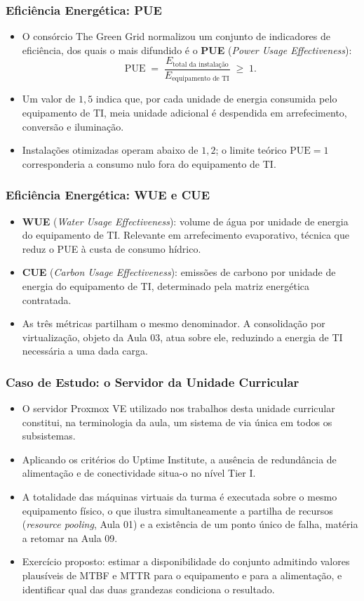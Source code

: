\documentclass[aspectratio=169]{beamer}
\begin{document}
\begin{frame}
\frametitle{Eficiência Energética: PUE}
\begin{itemize}
    \setlength\itemsep{0.35cm}
    \item O consórcio The Green Grid normalizou um conjunto de indicadores de eficiência, dos quais o mais difundido é o \textbf{PUE} (\emph{Power Usage Effectiveness}):
    \[
      \mathrm{PUE} \;=\; \frac{E_{\text{total da instalação}}}{E_{\text{equipamento de TI}}} \;\ge\; 1 .
    \]
    \item Um valor de $1{,}5$ indica que, por cada unidade de energia consumida pelo equipamento de TI, meia unidade adicional é despendida em arrefecimento, conversão e iluminação.
    \item Instalações otimizadas operam abaixo de $1{,}2$; o limite teórico $\mathrm{PUE}=1$ corresponderia a consumo nulo fora do equipamento de TI.
\end{itemize}
\end{frame}

\begin{frame}
\frametitle{Eficiência Energética: WUE e CUE}
\begin{itemize}
    \setlength\itemsep{0.4cm}
    \item \textbf{WUE} (\emph{Water Usage Effectiveness}): volume de água por unidade de energia do equipamento de TI. Relevante em arrefecimento evaporativo, técnica que reduz o PUE à custa de consumo hídrico.
    \item \textbf{CUE} (\emph{Carbon Usage Effectiveness}): emissões de carbono por unidade de energia do equipamento de TI, determinado pela matriz energética contratada.
    \item As três métricas partilham o mesmo denominador. A consolidação por virtualização, objeto da Aula 03, atua sobre ele, reduzindo a energia de TI necessária a uma dada carga.
\end{itemize}
\end{frame}

\begin{frame}
\frametitle{Caso de Estudo: o Servidor da Unidade Curricular}
\begin{itemize}
    \setlength\itemsep{0.35cm}
    \item O servidor Proxmox VE utilizado nos trabalhos desta unidade curricular constitui, na terminologia da aula, um sistema de via única em todos os subsistemas.
    \item Aplicando os critérios do Uptime Institute, a ausência de redundância de alimentação e de conectividade situa-o no nível Tier I.
    \item A totalidade das máquinas virtuais da turma é executada sobre o mesmo equipamento físico, o que ilustra simultaneamente a partilha de recursos (\emph{resource pooling}, Aula 01) e a existência de um ponto único de falha, matéria a retomar na Aula 09.
    \item Exercício proposto: estimar a disponibilidade do conjunto admitindo valores plausíveis de MTBF e MTTR para o equipamento e para a alimentação, e identificar qual das duas grandezas condiciona o resultado.
\end{itemize}
\end{frame}
\end{document}

